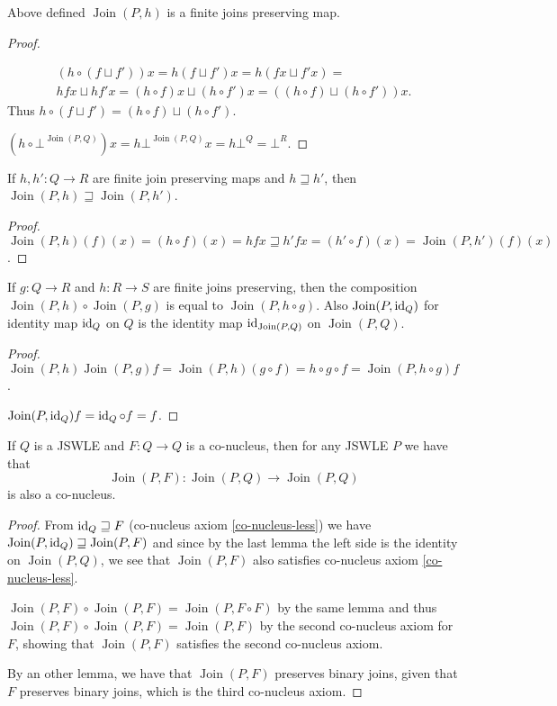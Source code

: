 \begin{lem}
Above defined $\operatorname{Join}(P,h)$ is a finite joins preserving
map.\end{lem}
\begin{proof}
~

\begin{multline*}
(h\circ(f\sqcup f'))x=h(f\sqcup f')x=h(fx\sqcup f'x)=\\
hfx\sqcup hf'x=(h\circ f)x\sqcup(h\circ f')x=((h\circ f)\sqcup(h\circ f'))x.
\end{multline*}
Thus $h\circ(f\sqcup f')=(h\circ f)\sqcup(h\circ f')$.

$(h\circ\bot^{\operatorname{Join}(P,Q)})x=h\bot^{\operatorname{Join}(P,Q)}x=h\bot^Q=\bot^R$.\end{proof}
\begin{prop}
If $h,h':Q\rightarrow R$ are finite join preserving maps and $h\sqsupseteq h'$,
then $\operatorname{Join}(P,h)\sqsupseteq\operatorname{Join}(P,h')$.\end{prop}
\begin{proof}
$\operatorname{Join}(P,h)(f)(x)=(h\circ f)(x)=hfx\sqsupseteq h'fx=(h'\circ f)(x)=\operatorname{Join}(P,h')(f)(x)$.\end{proof}
\begin{lem}
If $g:Q\rightarrow R$ and $h:R\rightarrow S$ are finite joins preserving,
then the composition $\operatorname{Join}(P,h)\circ\operatorname{Join}(P,g)$
is equal to $\operatorname{Join}(P,h\circ g)$. Also $\operatorname{Join}(P,\operatorname{id}_{Q})$
for identity map $\operatorname{id}_{Q}$ on $Q$ is the identity map $\operatorname{id}_{\operatorname{Join}(P,Q)}$
on $\operatorname{Join}(P,Q)$.\end{lem}
\begin{proof}
$\operatorname{Join}(P,h)\operatorname{Join}(P,g)f=\operatorname{Join}(P,h)(g\circ f)=h\circ g\circ f=\operatorname{Join}(P,h\circ g)f$.

$\operatorname{Join}(P,\operatorname{id}_{Q})f=\operatorname{id}_{Q}\circ f=f$.\end{proof}
\begin{cor}
\label{join-map-co-nucleus}If $Q$ is a JSWLE and $F:Q\rightarrow Q$
is a co-nucleus, then for any JSWLE $P$ we have that 
\[
\operatorname{Join}(P,F):\operatorname{Join}(P,Q)\rightarrow\operatorname{Join}(P,Q)
\]
 is also a co-nucleus.\end{cor}
\begin{proof}
From $\operatorname{id}_{Q}\sqsupseteq F$ (co-nucleus axiom \ref{co-nucleus-less})
we have $\operatorname{Join}(P,\operatorname{id}_{Q})\sqsupseteq\operatorname{Join}(P,F)$
and since by the last lemma the left side is the identity on $\operatorname{Join}(P,Q)$,
we see that $\operatorname{Join}(P,F)$ also satisfies co-nucleus
axiom \ref{co-nucleus-less}.

$\operatorname{Join}(P,F)\circ\operatorname{Join}(P,F)=\operatorname{Join}(P,F\circ F)$
by the same lemma and thus $\operatorname{Join}(P,F)\circ\operatorname{Join}(P,F)=\operatorname{Join}(P,F)$
by the second co-nucleus axiom for $F$, showing that $\operatorname{Join}(P,F)$
satisfies the second co-nucleus axiom.

By an other lemma, we have that $\operatorname{Join}(P,F)$ preserves
binary joins, given that $F$ preserves binary joins, which is the
third co-nucleus axiom.\end{proof}
